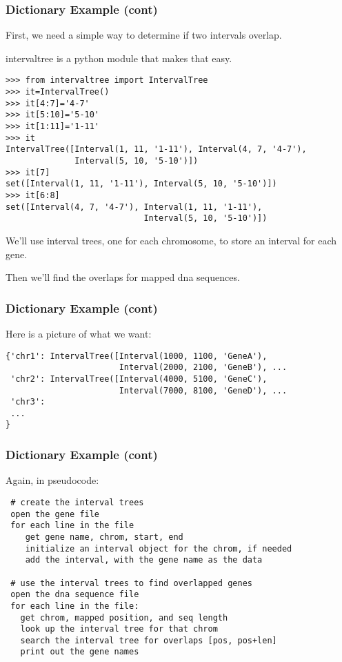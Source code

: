 \documentclass[10pt]{beamer}
\newcommand\smallfont{\fontsize{8pt}{7.2}\selectfont}
\begin{document}
\begin{frame}[fragile]
\frametitle{Dictionary Example (cont)}

First, we need a simple way to determine if two intervals overlap.  
\vspace{2mm}

intervaltree is a python module that makes that easy.

\smallfont
\begin{verbatim}
>>> from intervaltree import IntervalTree
>>> it=IntervalTree()
>>> it[4:7]='4-7'
>>> it[5:10]='5-10'
>>> it[1:11]='1-11'
>>> it
IntervalTree([Interval(1, 11, '1-11'), Interval(4, 7, '4-7'), 
              Interval(5, 10, '5-10')])
>>> it[7]
set([Interval(1, 11, '1-11'), Interval(5, 10, '5-10')])
>>> it[6:8]
set([Interval(4, 7, '4-7'), Interval(1, 11, '1-11'), 
                            Interval(5, 10, '5-10')]) 
\end{verbatim}

We'll use interval trees, one for each chromosome, to store an interval for each gene.
\vspace{2mm}

Then we'll find the overlaps for mapped dna sequences.

\end{frame}

\begin{frame}[fragile]
\frametitle{Dictionary Example (cont)}

Here is a picture of what we want:

\smallfont
\begin{verbatim}
{'chr1': IntervalTree([Interval(1000, 1100, 'GeneA'), 
                       Interval(2000, 2100, 'GeneB'), ...
 'chr2': IntervalTree([Interval(4000, 5100, 'GeneC'), 
                       Interval(7000, 8100, 'GeneD'), ...
 'chr3':
 ...
}
\end{verbatim}

\end{frame}


\begin{frame}[fragile]
\frametitle{Dictionary Example (cont)}
\smallfont
Again, in pseudocode:
\begin{verbatim}
 # create the interval trees
 open the gene file
 for each line in the file
    get gene name, chrom, start, end
    initialize an interval object for the chrom, if needed
    add the interval, with the gene name as the data

 # use the interval trees to find overlapped genes
 open the dna sequence file
 for each line in the file:
   get chrom, mapped position, and seq length
   look up the interval tree for that chrom
   search the interval tree for overlaps [pos, pos+len]
   print out the gene names

\end{verbatim}
\end{frame}
\end{document}
